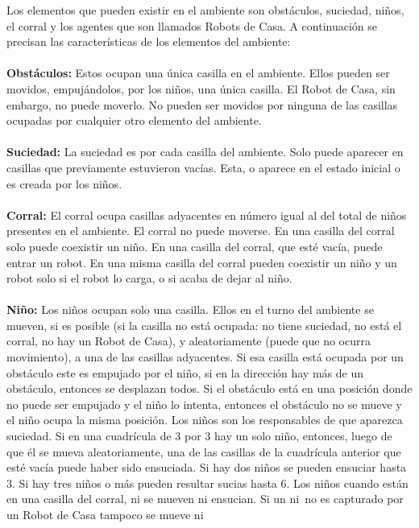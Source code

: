 \documentclass[a4paper,10pt]{article}
\begin{document}
  Los elementos que pueden existir en el ambiente son obst\'aculos, suciedad, ni\~nos, el corral y los agentes que son llamados Robots de Casa. A continuaci\'on se precisan las caracter\'isticas de los elementos del ambiente:\\\\
  \textbf{Obst\'aculos:} Estos ocupan una \'unica casilla en el ambiente. Ellos pueden ser movidos, empuj\'andolos, por los ni\~nos, una \'unica casilla. El Robot de Casa, sin embargo, no puede moverlo. No pueden ser movidos por ninguna de las casillas ocupadas por cualquier otro elemento del ambiente.\\\\
   \textbf{Suciedad:} La suciedad es por cada casilla del ambiente. Solo puede aparecer en casillas que previamente estuvieron vac\'ias. Esta, o aparece en el estado inicial o es creada por los ni\~nos.\\\\
   \textbf{Corral:} El corral ocupa casillas adyacentes en n\'umero igual al del total de ni\~nos presentes en el ambiente. El corral no puede moverse. En una casilla del corral solo puede coexistir un ni\~no. En una casilla del corral, que est\'e vac\'ia, puede entrar un robot. En una misma casilla del corral pueden coexistir un ni\~no y un robot solo si el robot lo carga, o si acaba de dejar al ni\~no.\\\\
   \textbf{Ni\~no:} Los ni\~nos ocupan solo una casilla. Ellos en el turno del ambiente se mueven, si es posible (si la casilla no est\'a ocupada: no tiene suciedad, no est\'a el corral, no hay un Robot de Casa), y aleatoriamente (puede que no ocurra
  movimiento), a una de las casillas adyacentes. Si esa casilla est\'a ocupada por un obst\'aculo este es empujado por el ni\~no, si en la direcci\'on hay m\'as de un obst\'aculo, entonces se desplazan todos. Si el obst\'aculo est\'a en una posici\'on donde no puede ser empujado y el ni\~no lo intenta, entonces el obst\'aculo no se mueve y el ni\~no ocupa la misma posici\'on. Los ni\~nos son los responsables de que aparezca suciedad. Si en una cuadr\'icula de 3 por 3 hay un solo ni\~no, entonces, luego de que \'el se mueva aleatoriamente, una de las casillas de la cuadr\'icula anterior que est\'e vac\'ia puede haber sido ensuciada. Si hay dos ni\~nos se pueden ensuciar hasta 3. Si hay tres ni\~nos o m\'as pueden resultar sucias hasta 6. Los ni\~nos cuando est\'an en una casilla del corral, ni se mueven ni ensucian. Si un ni~no es capturado por un Robot de Casa tampoco se mueve ni
\end{document}
